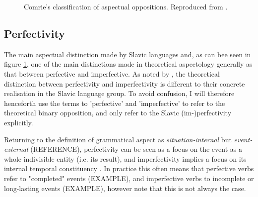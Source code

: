 \begin{figure}
    \centering
    \caption{Comrie's classification of aspectual oppositions. Reproduced from \citet{comrie1976aspect}.}
    \label{fig:comrieaspecttree}
\end{figure}

\subsection*{Perfectivity}
\label{sec:perfectivity}
The main aspectual distinction made by Slavic languages and, as can bee seen in figure \ref{fig:comrieaspecttree}, one of the main distinctions made in theoretical aspectology generally as that between perfective and imperfective. As noted by \citet{Dahl1985TenseAA}, the theoretical distinction between perfectivity and imperfectivity is different to their concrete realisation in the Slavic language group. To avoid confusion, I will therefore henceforth use the terms to 'perfective' and 'imperfective' to refer to the theoretical binary opposition, and only refer to the Slavic (im-)perfectivity explicitly.

Returning to the definition of grammatical aspect as \emph{situation-internal} but \emph{event-external} (REFERENCE), perfectivity can be seen as a focus on the event as a whole indivisible entity (i.e. its result), and imperfectivity implies a focus on its internal temporal constituency \citep{comrie1976aspect, wals-65}. In practice this often means that perfective verbs refer to "completed" events (EXAMPLE), and imperfective verbs to incomplete or long-lasting events (EXAMPLE), however note that this is not always the case.

